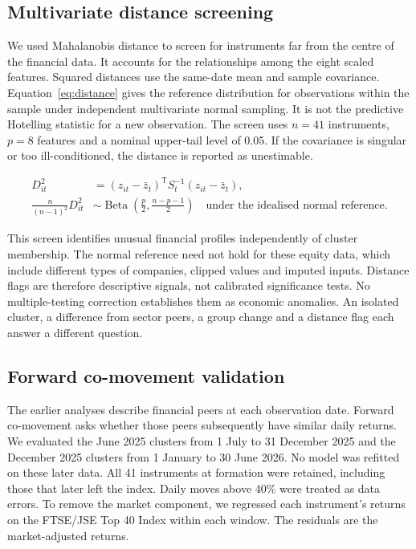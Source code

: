 \subsection{Multivariate distance screening}

We used Mahalanobis distance to screen for instruments far from the centre of the financial data. It accounts for the relationships among the eight scaled features. Squared distances use the same-date mean and sample covariance. Equation~\ref{eq:distance} gives the reference distribution for observations within the sample under independent multivariate normal sampling. It is not the predictive Hotelling statistic for a new observation. The screen uses $n=41$ instruments, $p=8$ features and a nominal upper-tail level of 0.05. If the covariance is singular or too ill-conditioned, the distance is reported as unestimable.


\begin{align}
D_{it}^2&=(z_{it}-\bar z_t)^{\mathsf T}S_t^{-1}(z_{it}-\bar z_t),\\
\frac{n}{(n-1)^2}D_{it}^2&\sim\operatorname{Beta}\!\left(\frac p2,\frac{n-p-1}{2}\right)
\quad\text{under the idealised normal reference}.
\label{eq:distance}\end{align}

This screen identifies unusual financial profiles independently of cluster membership. The normal reference need not hold for these equity data, which include different types of companies, clipped values and imputed inputs. Distance flags are therefore descriptive signals, not calibrated significance tests. No multiple-testing correction establishes them as economic anomalies. An isolated cluster, a difference from sector peers, a group change and a distance flag each answer a different question.

\subsection{Forward co-movement validation}

The earlier analyses describe financial peers at each observation date. Forward co-movement asks whether those peers subsequently have similar daily returns. We evaluated the June 2025 clusters from 1 July to 31 December 2025 and the December 2025 clusters from 1 January to 30 June 2026. No model was refitted on these later data. All 41 instruments at formation were retained, including those that later left the index. Daily moves above 40\% were treated as data errors. To remove the market component, we regressed each instrument's returns on the FTSE/JSE Top 40 Index within each window. The residuals are the market-adjusted returns.

